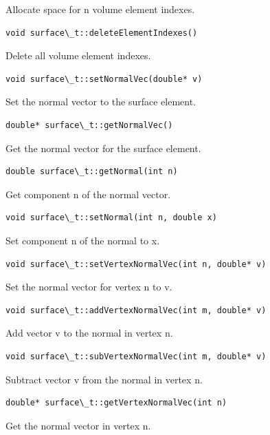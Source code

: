 \documentclass[a4paper,12pt]{article}
\begin{document}
Allocate space for n volume element indexes.
\begin{verbatim}
void surface\_t::deleteElementIndexes()
\end{verbatim}
Delete all volume element indexes.
\begin{verbatim}
void surface\_t::setNormalVec(double* v)
\end{verbatim}
Set the normal vector to the surface element.
\begin{verbatim}
double* surface\_t::getNormalVec()
\end{verbatim}
Get the normal vector for the surface element.
\begin{verbatim}
double surface\_t::getNormal(int n)
\end{verbatim}
Get component n of the normal vector.
\begin{verbatim}
void surface\_t::setNormal(int n, double x)
\end{verbatim}
Set component n of the normal to x.
\begin{verbatim}
void surface\_t::setVertexNormalVec(int n, double* v)
\end{verbatim}
Set the normal vector for vertex n to v.
\begin{verbatim}
void surface\_t::addVertexNormalVec(int m, double* v)
\end{verbatim}
Add vector v to the normal in vertex n.
\begin{verbatim}
void surface\_t::subVertexNormalVec(int m, double* v)
\end{verbatim}
Subtract vector v from the normal in vertex n.
\begin{verbatim}
double* surface\_t::getVertexNormalVec(int n)
\end{verbatim}
Get the normal vector in vertex n.
\end{document}
